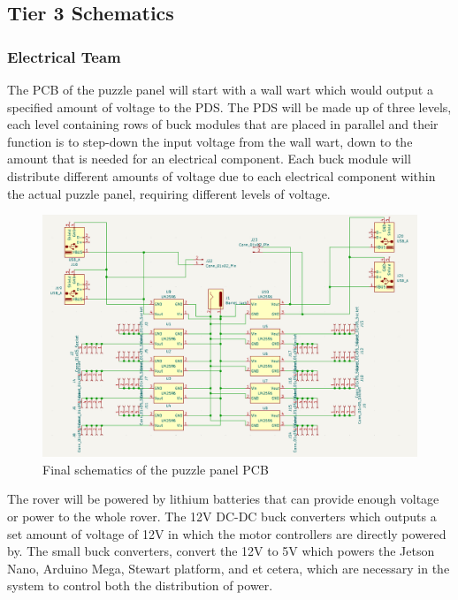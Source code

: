 \documentclass[a4paper, 10pt]{article}
\begin{document}
    \pagebreak
	\subsection{Tier 3 Schematics}

		\subsubsection{Electrical Team}
		The PCB of the puzzle panel will start with a wall wart which would output a specified amount of voltage to the PDS. The PDS will be made up of three levels, each level containing rows of buck modules that are placed in parallel and their function is to step-down the input voltage from the wall wart, down to the amount that is needed for an electrical component. Each buck module will distribute different amounts of voltage due to each electrical component within the actual puzzle panel, requiring different levels of voltage.
		
		\begin{figure} [!h]
			\centering
			\includegraphics[scale=0.65]{Photos/Puzzle Panel schematic 1}
			\caption{Final schematics of the puzzle panel PCB}
			\label{puzzle_panel_PCB}
		\end{figure}

		The rover will be powered by lithium batteries that can provide enough voltage or power to the whole rover. The 12V DC-DC buck converters which outputs a set amount of voltage of 12V in which the motor controllers are directly powered by. The small buck converters, convert the 12V to 5V which powers the Jetson Nano, Arduino Mega, Stewart platform, and et cetera, which are necessary in the system to control both the distribution of power. 
		
\end{document}
